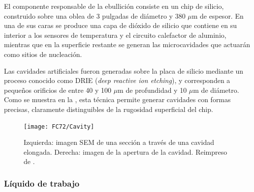 
%

El componente responsable de la ebullici\'on consiste en un chip de silicio, construido sobre una oblea de 3 pulgadas de di\'ametro y 380 $\mu$m de espesor. En una de sus caras se produce una capa de di\'oxido de silicio que contiene en su interior a los sensores de temperatura y el circuito calefactor de aluminio, mientras que en la superficie restante se generan las microcavidades que actuar\'an como sitios de nucleaci\'on.

Las cavidades artificiales fueron generadas sobre la placa de silicio mediante un proceso conocido como DRIE (\emph{deep reactive ion etching}), y corresponden a peque\~nos orificios de entre 40 y 100 $\mu$m de profundidad y 10 $\mu$m de di\'ametro. Como se muestra en la , esta t\'ecnica permite generar cavidades con formas precisas, claramente distinguibles de la rugosidad superficial del chip.

\begin{figure}[ht]
	\centering
	\texttt{[image: FC72/Cavity]}
	\caption{Izquierda: imagen SEM de una secci\'on a trav\'es de una cavidad elongada. Derecha: imagen de la apertura de la cavidad. Reimpreso de \cite{hutter_experimental_2010}.}
	\label{fig:cavidad}
\end{figure}


\subsubsection{L\'iquido de trabajo}

